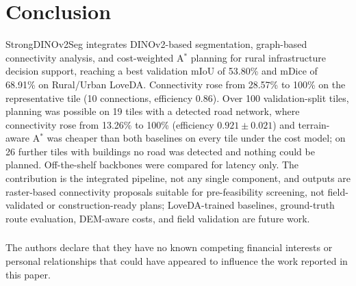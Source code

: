 \documentclass[runningheads]{llncs}
\begin{document}
\section{Conclusion}
StrongDINOv2Seg integrates DINOv2-based segmentation, graph-based connectivity analysis, and cost-weighted A$^{*}$ planning for rural infrastructure decision support, reaching a best validation mIoU of 53.80\% and mDice of 68.91\% on Rural/Urban LoveDA. Connectivity rose from 28.57\% to 100\% on the representative tile (10 connections, efficiency 0.86). Over 100 validation-split tiles, planning was possible on 19 tiles with a detected road network, where connectivity rose from 13.26\% to 100\% (efficiency $0.921\pm0.021$) and terrain-aware A$^{*}$ was cheaper than both baselines on every tile under the cost model; on 26 further tiles with buildings no road was detected and nothing could be planned. Off-the-shelf backbones were compared for latency only. The contribution is the integrated pipeline, not any single component, and outputs are raster-based connectivity proposals suitable for pre-feasibility screening, not field-validated or construction-ready plans; LoveDA-trained baselines, ground-truth route evaluation, DEM-aware costs, and field validation are future work.

\begin{credits}
\subsubsection{\discintname}
The authors declare that they have no known competing financial interests or personal relationships that could have appeared to influence the work reported in this paper.
\end{credits}
\end{document}
